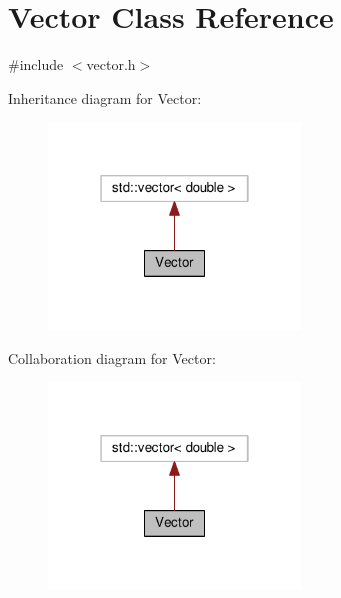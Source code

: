 \hypertarget{classVector}{}\section{Vector Class Reference}
\label{classVector}


{\ttfamily \#include $<$vector.\+h$>$}



Inheritance diagram for Vector\+:
\nopagebreak
\begin{figure}[H]
\begin{center}
\leavevmode
\includegraphics[width=190pt]{classVector__inherit__graph}
\end{center}
\end{figure}


Collaboration diagram for Vector\+:
\nopagebreak
\begin{figure}[H]
\begin{center}
\leavevmode
\includegraphics[width=190pt]{classVector__coll__graph}
\end{center}
\end{figure}
